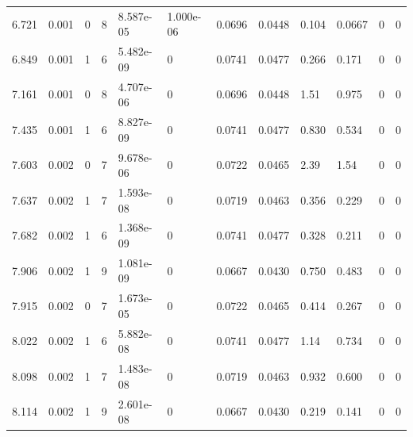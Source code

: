 \documentclass[preview]{standalone}
\begin{document}
{{{\begin{tabular}{L{1.2cm}C{1.2cm} C{0.3cm}C{0.5cm} C{1.4cm}C{1.4cm} C{1.4cm}C{1.4cm} C{1.6cm}C{1.6cm} C{1.6cm}C{1.6cm}}
  6.721  &  0.001  & 0     &  8 &  8.587e-05  & 1.000e-06  &  0.0696&   0.0448& 0.104 & 0.0667   &  0 & 0  \\ 
  6.849  &  0.001  & 1     &  6 &  5.482e-09  & 0  &  0.0741&   0.0477& 0.266 & 0.171   &  0 & 0  \\ 
  7.161  &  0.001  & 0     &  8 &  4.707e-06  & 0  &  0.0696&   0.0448& 1.51 & 0.975   &  0 & 0  \\ 
  7.435  &  0.001  & 1     &  6 &  8.827e-09  & 0  &  0.0741&   0.0477& 0.830 & 0.534   &  0 & 0  \\ 
  7.603  &  0.002  & 0     &  7 &  9.678e-06  & 0  &  0.0722&   0.0465& 2.39 & 1.54   &  0 & 0  \\ 
  7.637  &  0.002  & 1     &  7 &  1.593e-08  & 0  &  0.0719&   0.0463& 0.356 & 0.229   &  0 & 0  \\ 
  7.682  &  0.002  & 1     &  6 &  1.368e-09  & 0  &  0.0741&   0.0477& 0.328 & 0.211   &  0 & 0  \\ 
  7.906  &  0.002  & 1     &  9 &  1.081e-09  & 0  &  0.0667&   0.0430& 0.750 & 0.483   &  0 & 0  \\ 
  7.915  &  0.002  & 0     &  7 &  1.673e-05  & 0  &  0.0722&   0.0465& 0.414 & 0.267   &  0 & 0  \\ 
  8.022  &  0.002  & 1     &  6 &  5.882e-08  & 0  &  0.0741&   0.0477& 1.14 & 0.734   &  0 & 0  \\ 
  8.098  &  0.002  & 1     &  7 &  1.483e-08  & 0  &  0.0719&   0.0463& 0.932 & 0.600   &  0 & 0  \\ 
  8.114  &  0.002  & 1     &  9 &  2.601e-08  & 0  &  0.0667&   0.0430& 0.219 & 0.141   &  0 & 0  \\ 
\hline 
\end{tabular} 

}}}
\end{document}
